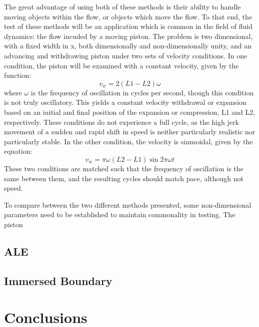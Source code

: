 \documentclass{article}
\begin{document}
The great advantage of using both of these methods is their ability to handle moving objects within the flow, or objects which move the flow.  To that end, the test of these methods will be an application which is common in the field of fluid dynamics: the flow incuded by a moving piston.  The problem is two dimensional, with a fixed width in x, both dimensionally and non-dimensionally unity, and an advancing and withdrawing piston under two sets of velocity conditions.  In one condition, the piston will be examined with a constant velocity, given by the function:
\begin{equation}
  v_w = 2 (L1-L2) \omega
\end{equation}
where $\omega$ is the frequency of oscillation in cycles per second, though this condition is not truly oscillatory.  This yields a constant velocity withdrawal or expansion based on an initial and final position of the expansion or compression, L1 and L2, respectively.  These conditions do not experience a full cycle, as the high jerk movement of a sudden and rapid shift in speed is neither particularly realistic nor particularly stable.  In the other condition, the velocity is sinusoidal, given by the equation:
\begin{equation}
  v_w = \pi \omega (L2-L1) \sin{2 \pi \omega t}
\end{equation}
These two conditions are matched such that the frequency of oscillation is the same between them, and the resulting cycles should match pace, although not speed.  

To compare between the two different methods presented, some non-dimensional parameters need to be established to maintain commonality in testing.  The piston

\subsection{ALE}



\subsection{Immersed Boundary}



\section{Conclusions}









\end{document}
